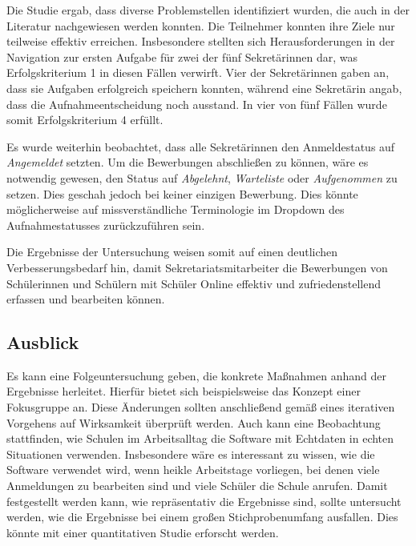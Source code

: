 Die Studie ergab, dass diverse Problemstellen identifiziert wurden, die auch in der Literatur nachgewiesen werden konnten. Die Teilnehmer konnten ihre Ziele nur teilweise effektiv erreichen. Insbesondere stellten sich Herausforderungen in der Navigation zur ersten Aufgabe für zwei der fünf Sekretärinnen dar, was Erfolgskriterium 1 in diesen Fällen verwirft. Vier der Sekretärinnen gaben an, dass sie Aufgaben erfolgreich speichern konnten, während eine Sekretärin angab, dass die Aufnahmeentscheidung noch ausstand. In vier von fünf Fällen wurde somit Erfolgskriterium 4 erfüllt.

Es wurde weiterhin beobachtet, dass alle Sekretärinnen den Anmeldestatus auf \textit{Angemeldet} setzten. Um die Bewerbungen abschließen zu können, wäre es notwendig gewesen, den Status auf \textit{Abgelehnt}, \textit{Warteliste} oder \textit{Aufgenommen} zu setzen. Dies geschah jedoch bei keiner einzigen Bewerbung. Dies könnte möglicherweise auf missverständliche Terminologie im Dropdown des Aufnahmestatusses zurückzuführen sein. 

Die Ergebnisse der Untersuchung weisen somit auf einen deutlichen Verbesserungsbedarf hin, damit Sekretariatsmitarbeiter die Bewerbungen von Schülerinnen und Schülern mit Schüler Online effektiv und zufriedenstellend erfassen und bearbeiten können.

\subsection{Ausblick}
Es kann eine Folgeuntersuchung geben, die konkrete Maßnahmen anhand der Ergebnisse herleitet. Hierfür bietet sich beispielsweise das Konzept einer Fokusgruppe an. Diese Änderungen sollten anschließend gemäß eines iterativen Vorgehens  auf Wirksamkeit überprüft werden. 
Auch kann eine Beobachtung stattfinden, wie Schulen im Arbeitsalltag die Software mit Echtdaten in echten Situationen verwenden. Insbesondere wäre es interessant zu wissen, wie die Software verwendet wird, wenn heikle Arbeitstage vorliegen, bei denen viele Anmeldungen zu bearbeiten sind und viele Schüler die Schule anrufen.
Damit festgestellt werden kann, wie repräsentativ die Ergebnisse sind, sollte untersucht werden, wie die Ergebnisse bei einem großen Stichprobenumfang ausfallen. Dies könnte mit einer quantitativen Studie erforscht werden.
